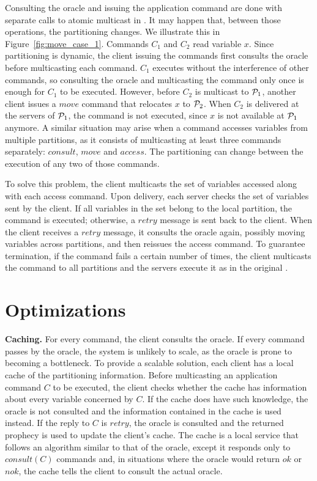 Consulting the oracle and issuing the application command are done with separate
calls to atomic multicast in \dssmr{}. It may happen that, between those
operations, the partitioning changes. We illustrate this in
Figure~\ref{fig:move_case_1}. Commands $C_1$ and $C_2$ read variable $x$. Since
partitioning is dynamic, the client issuing the commands first consults the
oracle before multicasting each command. $C_1$ executes without the interference
of other commands, so consulting the oracle and multicasting the command only
once is enough for $C_1$ to be executed. However, before $C_2$ is multicast to
$\mathcal{P}_1$, another client issues a $move$ command that relocates $x$ to $\mathcal{P}_2$.
When $C_2$ is delivered at the servers of $\mathcal{P}_1$, the command is not executed,
since $x$ is not available at $\mathcal{P}_1$ anymore. A similar situation may arise
when a command accesses variables from multiple partitions, as it consists of
multicasting at least three commands separately: $consult$, $move$ and $access$.
The partitioning can change between the execution of any two of those commands.

To solve this problem, the client multicasts the set of variables accessed along
with each access command. Upon delivery, each server checks the set of variables
sent by the client. If all variables in the set belong to the local partition,
the command is executed; otherwise, a $retry$ message is sent back to the
client. When the client receives a $retry$ message, it consults the oracle
again, possibly moving variables across partitions, and then reissues the access
command. To guarantee termination, if the command fails a certain number of
times, the client multicasts the command to all partitions and the servers
execute it as in the original \ssmr{}.

\section{Optimizations}
\label{sec:optm}

\textbf{Caching.} For every command, the client consults the oracle. If every
command passes by the oracle, the system is unlikely to scale, as the oracle is
prone to becoming a bottleneck. To provide a scalable solution, each client has
a local cache of the partitioning information. Before multicasting an
application command $C$ to be executed, the client checks whether the cache has
information about every variable concerned by $C$. If the cache does have such
knowledge, the oracle is not consulted and the information contained in the
cache is used instead. If the reply to $C$ is $retry$, the oracle is consulted
and the returned prophecy is used to update the client's cache. The cache is a
local service that follows an algorithm similar to that of the oracle, except it
responds only to $consult(C)$ commands and, in situations where the oracle would
return $ok$ or $nok$, the cache tells the client to consult the actual oracle.


